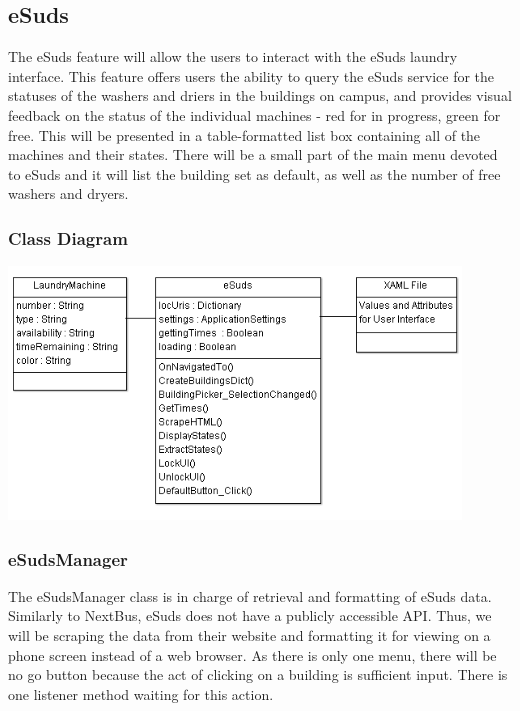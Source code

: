 \documentclass[pdftex,12pt,letter]{article}
\begin{document}
\subsection{eSuds}
The eSuds feature will allow the users to interact with the eSuds laundry interface. This feature offers users the ability to query the eSuds service for the statuses of the washers and driers in the buildings on campus, and provides visual feedback on the status of the individual machines - red for in progress, green for free. This will be presented in a table-formatted list box containing all of the machines and their states. There will be a small part of the main menu devoted to eSuds and it will list the building set as default, as well as the number of free washers and dryers.
\subsubsection{Class Diagram}
\begin{flushleft}
\includegraphics[width=120mm]{eSuds.png}
\end{flushleft}
\subsubsection{eSudsManager}
The eSudsManager class is in charge of retrieval and formatting of eSuds data. Similarly to NextBus, eSuds does not have a publicly accessible API. Thus, we will be scraping the data from their website and formatting it for viewing on a phone screen instead of a web browser. As there is only one menu, there will be no go button because the act of clicking on a building is sufficient input. There is one listener method waiting for this action.
\end{document}
